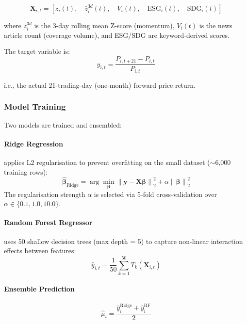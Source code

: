 \documentclass[12pt, a4paper]{article}
\begin{document}
\begin{equation}
    \mathbf{X}_{i,t} = \left[z_i(t),\quad \bar{z}_i^{3d}(t),\quad V_i(t),\quad \text{ESG}_i(t),\quad \text{SDG}_i(t)\right]
\end{equation}

where $\bar{z}_i^{3d}$ is the 3-day rolling mean Z-score (momentum), $V_i(t)$ is the news article count (coverage volume), and ESG/SDG are keyword-derived scores.

The target variable is:
\begin{equation}
    y_{i,t} = \frac{P_{i,t+21} - P_{i,t}}{P_{i,t}}
    \label{eq:target}
\end{equation}

i.e., the actual 21-trading-day (one-month) forward price return.

\subsubsection{Model Training}

Two models are trained and ensembled:

\paragraph{Ridge Regression} applies L2 regularisation to prevent overfitting on the small dataset ($\sim$6{,}000 training rows):
\begin{equation}
    \hat{\boldsymbol{\beta}}_{\text{Ridge}} = \arg\min_{\boldsymbol{\beta}} \left\|\mathbf{y} - \mathbf{X}\boldsymbol{\beta}\right\|_2^2 + \alpha\left\|\boldsymbol{\beta}\right\|_2^2
\end{equation}
The regularisation strength $\alpha$ is selected via 5-fold cross-validation over $\alpha \in \{0.1, 1.0, 10.0\}$.

\paragraph{Random Forest Regressor} uses 50 shallow decision trees (max depth = 5) to capture non-linear interaction effects between features:
\begin{equation}
    \hat{y}_{i,t} = \frac{1}{50}\sum_{k=1}^{50} T_k(\mathbf{X}_{i,t})
\end{equation}

\paragraph{Ensemble Prediction}
\begin{equation}
    \hat{\mu}_i = \frac{\hat{y}^{\text{Ridge}}_i + \hat{y}^{\text{RF}}_i}{2}
\end{equation}
\end{document}
